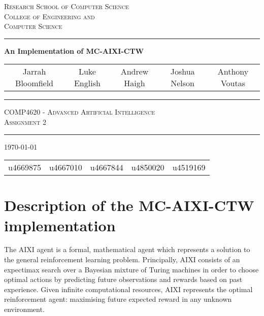 \documentclass[pdftex,twoside,a4paper]{report}
\begin{document}
\begin{titlepage}
\renewcommand*{\thefootnote}{\fnsymbol{footnote}}
\begin{center}

\textsc{\Large Research School of Computer Science}\\[0.5cm]
\textsc{\Large College of Engineering and}\\[0.2cm]
\textsc{\Large Computer Science}\\[0.5cm]
\vspace{1.4cm}
\hrule
\vspace{1.4cm}
{\huge \bfseries An Implementation of MC-AIXI-CTW} \\
\vspace{0.4cm}


\begin{tabular}{ccccc}
  Jarrah Bloomfield\footnotemark &
  Luke English\footnotemark &
  Andrew Haigh\footnotemark &
  Joshua Nelson\footnotemark &
  Anthony Voutas\footnotemark
\end{tabular}

\vspace{1.4cm}
\hrule
\vspace{1.0cm}
\textsc{\large COMP4620 - Advanced Artificial Intelligence}\\
\textsc{Assignment 2}\\
\vspace{1.0cm}
\hrule
\vspace{1.4cm}
\vfill
{\large \today} \\[0.5cm]

\begin{tabular}{ccccc}
  \setcounter{footnote}{0}
  u4669875\footnotemark &
  u4667010\footnotemark &
  u4667844\footnotemark &
  u4850020\footnotemark &
  u4519169\footnotemark
\end{tabular}
\end{center}
 
\end{titlepage}
\chapter{Description of the MC-AIXI-CTW implementation}

The AIXI agent is a formal, mathematical agent which represents a solution to
the general reinforcement learning problem. Principally, AIXI consists of an
expectimax search over a Bayesian mixture of Turing machines in order to
choose optimal actions by predicting future observations and rewards based on
past experience. Given infinite computational resources, AIXI represents the
optimal reinforcement agent: maximising future expected reward in any unknown
environment.
\end{document}
